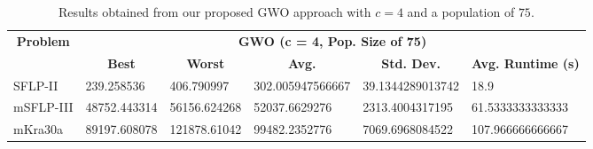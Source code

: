 \begin{table}[h!]
	\begin{adjustwidth}{-1.18in}{}
		\centering
		\begin{tabular}{|l|l|l|l|l|l|}
			\hline
			\multicolumn{1}{|c|}{\multirow{2}{*}{\textbf{Problem}}} & \multicolumn{5}{c|}{\textbf{GWO (c = 4, Pop. Size of 75)}} \\ \cline{2-6} 
			\multicolumn{1}{|c|}{}                                  & \multicolumn{1}{c|}{\textbf{Best}} & \multicolumn{1}{c|}{\textbf{Worst}} & \multicolumn{1}{c|}{\textbf{Avg.}} & \multicolumn{1}{c|}{\textbf{Std. Dev.}} & \multicolumn{1}{c|}{\textbf{Avg. Runtime (s)}} \\ \hline
			SFLP-II                                                 & 239.258536                                  & 406.790997                                   & 302.005947566667                      & 39.1344289013742                                 & 18.9                                  \\ \hline
			mSFLP-III                                               & 48752.443314                                & 56156.624268                                 & 52037.6629276						         & 2313.4004317195                              & 61.5333333333333                               \\ \hline
			mKra30a                                               & 89197.608078                                & 121878.61042                                 &
			99482.2352776							&
			7069.6968084522							&
			107.966666666667						\\ \hline
		\end{tabular}
	\end{adjustwidth}
	\caption{Results obtained from our proposed GWO approach with $c = 4$ and a population of $75$.}
	\label{approach-gwo-c4-p75-results}
\end{table}

